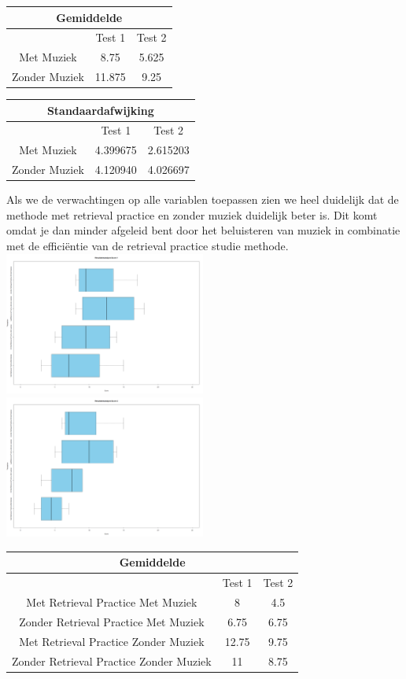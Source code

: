 \documentclass{hogent-article}
\begin{document}
	\begin{tabular}{ |c|c|c| }
	\hline
		\multicolumn{3}{|c|}{Gemiddelde} \\
	\hline
		& Test 1 & Test 2 \\
	\hline
		Met Muziek & 8.75  & 5.625 \\
		Zonder Muziek & 11.875 & 9.25 \\
	\hline
	\end{tabular}
	
	\begin{tabular}{ |c|c|c| }
	\hline
		\multicolumn{3}{|c|}{Standaardafwijking} \\
	\hline
		& Test 1 & Test 2 \\
	\hline
		Met Muziek & 4.399675  & 2.615203 \\
		Zonder Muziek & 4.120940 & 4.026697 \\
	\hline
	\end{tabular}
	
	Als we de verwachtingen op alle variablen toepassen zien we heel duidelijk dat de methode met retrieval practice en zonder muziek duidelijk beter is. Dit komt omdat je dan minder afgeleid bent door het beluisteren van muziek in combinatie met de efficiëntie van de retrieval practice studie methode. 
	\includegraphics[width=250px]{Verwacht_MuziekRT_Score1}
	\includegraphics[width=250px]{Verwacht_MuziekRT_Score2}
	\begin{tabular}{ |c|c|c| }
	\hline
		\multicolumn{3}{|c|}{Gemiddelde} \\
	\hline
		& Test 1 & Test 2 \\
	\hline
		Met Retrieval Practice Met Muziek  & 8 & 4.5 \\
		Zonder Retrieval Practice Met Muziek & 6.75 & 6.75 \\
		Met Retrieval Practice Zonder Muziek & 12.75  & 9.75 \\
		Zonder Retrieval Practice Zonder Muziek & 11 & 8.75 \\
	\hline
	\end{tabular}
	
\end{document}
